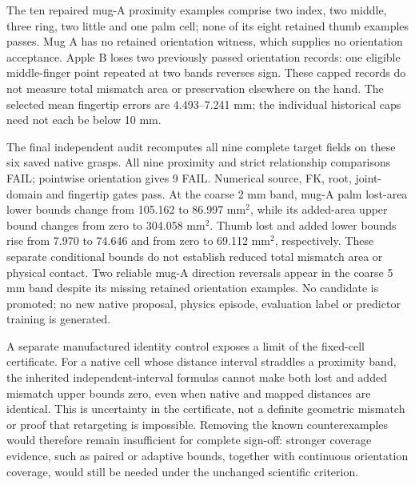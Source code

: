 \documentclass[10pt,letterpaper]{article}
\begin{document}
The ten repaired mug-A proximity examples comprise two index, two middle,
three ring, two little and one palm cell; none of its eight retained thumb
examples passes. Mug A has no retained orientation witness, which supplies no
orientation acceptance. Apple B loses two previously passed orientation
records: one eligible middle-finger point repeated at two bands reverses sign.
These capped records do not measure total mismatch area or preservation
elsewhere on the hand. The selected mean fingertip errors are 4.493--7.241 mm;
the individual historical caps need not each be below 10 mm.

The final independent audit recomputes all nine complete target fields on
these six saved native grasps. All nine proximity and strict relationship
comparisons FAIL; pointwise orientation gives 9 FAIL. Numerical source,
FK, root, joint-domain and fingertip gates pass. At the coarse 2 mm band,
mug-A palm lost-area lower bounds change from 105.162 to 86.997 mm$^2$, while
its added-area upper bound changes from zero to 304.058 mm$^2$. Thumb lost
and added lower bounds rise from 7.970 to 74.646 and from zero to 69.112
mm$^2$, respectively. These separate conditional bounds do not establish
reduced total mismatch area or physical contact. Two reliable mug-A direction
reversals appear in the coarse 5 mm band despite its missing retained
orientation examples. No candidate is promoted; no new native proposal,
physics episode, evaluation label or predictor training is generated.

A separate manufactured identity control exposes a limit of the fixed-cell
certificate. For a native cell whose distance interval straddles a proximity
band, the inherited independent-interval formulas cannot make both lost and
added mismatch upper bounds zero, even when native and mapped distances are
identical. This is uncertainty in the certificate, not a definite geometric
mismatch or proof that retargeting is impossible. Removing the known
counterexamples would therefore remain insufficient for complete sign-off:
stronger coverage evidence, such as paired or adaptive bounds, together with
continuous orientation coverage, would still be needed under the unchanged scientific criterion.
\end{document}
